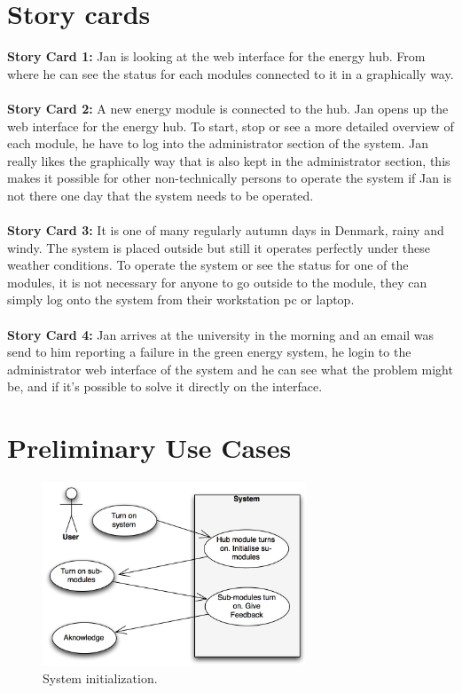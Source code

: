 \section{Story cards}
\textbf{Story Card 1:} Jan is looking at the web interface for the energy hub. From where he can see the status for each modules connected to it
in a graphically way.\\\\
\textbf{Story Card 2:} A new energy module is connected to the hub. Jan opens up the web interface for the energy hub. 
To start, stop or see a more detailed overview of each module, he have to log into the administrator section of the system.
Jan really likes the graphically way that is also kept in the administrator section, this makes it possible for other
non-technically persons to operate the system if Jan is not there one day that the system needs to be operated.\\\\
\textbf{Story Card 3:} It is one of many regularly autumn days in Denmark, rainy and windy. The system is placed outside
but still it operates perfectly under these weather conditions. To operate the system or see the status for one of the modules,
it is not necessary for anyone to go outside to the module, they can simply log onto the system from their workstation pc or laptop.\\\\
\textbf{Story Card 4:} Jan arrives at the university in the morning and an email was send to him reporting a failure in the green energy system, he login to the administrator web interface of the system and he can see what the problem might be, and if it's possible to solve it directly on the interface.

\section{Preliminary Use Cases}

\begin{figure}[H]
	\begin{centering}
		\includegraphics[width=0.7\textwidth]{images/usecases1.jpg}
		\caption{System initialization. }
	\end{centering}
\end{figure}

